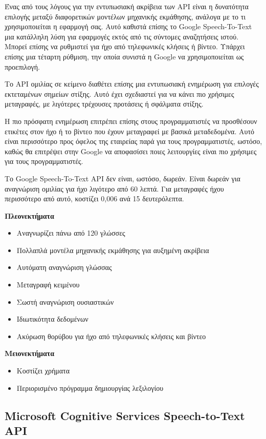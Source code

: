 \documentclass[oneside, 12pt]{book}
\begin{document}
Ένας από τους λόγους για την εντυπωσιακή ακρίβεια των API είναι η δυνατότητα επιλογής μεταξύ διαφορετικών μοντέλων μηχανικής εκμάθησης, ανάλογα με το τι χρησιμοποιείται η εφαρμογή σας. Αυτό καθιστά επίσης το Google Speech-To-Text μια κατάλληλη λύση για εφαρμογές εκτός από τις σύντομες αναζητήσεις ιστού. Μπορεί επίσης να ρυθμιστεί για ήχο από τηλεφωνικές κλήσεις ή βίντεο. Υπάρχει επίσης μια τέταρτη ρύθμιση, την οποία συνιστά η Google να χρησιμοποιείται ως προεπιλογή.

Το API ομιλίας σε κείμενο διαθέτει επίσης μια εντυπωσιακή ενημέρωση για επιλογές εκτεταμένων σημείων στίξης. Αυτό έχει σχεδιαστεί για να κάνει πιο χρήσιμες μεταγραφές, με λιγότερες τρέχουσες προτάσεις ή σφάλματα στίξης.

Η πιο πρόσφατη ενημέρωση επιτρέπει επίσης στους προγραμματιστές να προσθέσουν ετικέτες στον ήχο ή το βίντεο που έχουν μεταγραφεί με βασικά μεταδεδομένα. Αυτό είναι περισσότερο προς όφελος της εταιρείας παρά για τους προγραμματιστές, ωστόσο, καθώς θα επιτρέψει στην Google να αποφασίσει ποιες λειτουργίες είναι πιο χρήσιμες για τους προγραμματιστές.

Το Google Speech-To-Text API δεν είναι, ωστόσο, δωρεάν. Είναι δωρεάν για αναγνώριση ομιλίας για ήχο λιγότερο από 60 λεπτά. Για μεταγραφές ήχου περισσότερο από αυτό, κοστίζει 0,006  ανά 15 δευτερόλεπτα.

\textbf{Πλεονεκτήματα}
\begin{itemize}
  \item Αναγνωρίζει πάνω από 120 γλώσσες
  \item Πολλαπλά μοντέλα μηχανικής εκμάθησης για αυξημένη ακρίβεια
  \item Αυτόματη αναγνώριση γλώσσας
  \item Μεταγραφή κειμένου
  \item Σωστή αναγνώριση ουσιαστικών
  \item Ιδιωτικότητα δεδομένων
  \item Ακύρωση θορύβου για ήχο από τηλεφωνικές κλήσεις και βίντεο
\end{itemize}
\textbf{Μειονεκτήματα}
\begin{itemize}
  \item Κοστίζει χρήματα
  \item Περιορισμένο πρόγραμμα δημιουργίας λεξιλογίου
\end{itemize}
\subsection{Microsoft Cognitive Services Speech-to-Text API}
\label{subsec:microsoft-cognitive-services-speech-to-text-api}
\end{document}
